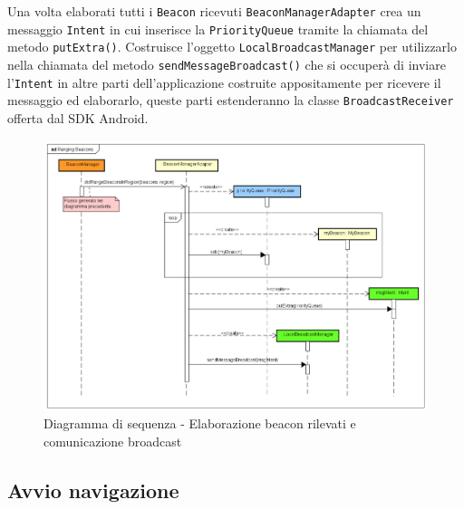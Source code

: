 \documentclass[../DefinizioneDiProdotto.tex]{subfiles}
\begin{document}
	Una volta elaborati tutti i \verb|Beacon| ricevuti \verb|BeaconManagerAdapter| crea un messaggio \verb|Intent| in cui inserisce la \verb|PriorityQueue| tramite la chiamata del metodo \verb|putExtra()|. Costruisce l'oggetto \verb|LocalBroadcastManager| per utilizzarlo nella chiamata del metodo \verb|sendMessageBroadcast()| che si occuperà di inviare l'\verb|Intent| in altre parti dell'applicazione costruite appositamente per ricevere il messaggio ed elaborarlo, queste parti estenderanno la classe \verb|BroadcastReceiver| offerta dal SDK Android\g.

		\begin{figure} [p]
			\includegraphics[width=\textwidth]{diagrams/RangingBeacons}
			\caption{Diagramma di sequenza - Elaborazione beacon rilevati e comunicazione broadcast}
			\label{RangingBeacons}
		\end{figure}
	
	
	\newpage
	\subsection{Avvio navigazione}
		
\end{document}
